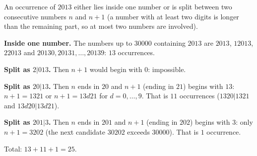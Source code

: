 An occurrence of $2013$ either lies inside one number or is split between two consecutive numbers $n$ and $n+1$ (a number with at least two digits is longer than the remaining part, so at most two numbers are involved).

\textbf{Inside one number.} The numbers up to $30000$ containing $2013$ are $2013$, $12013$, $22013$ and $20130,20131,\dots,20139$: $13$ occurrences.

\textbf{Split as $2|013$.} Then $n+1$ would begin with $0$: impossible.

\textbf{Split as $20|13$.} Then $n$ ends in $20$ and $n+1$ (ending in $21$) begins with $13$: $n+1=1321$ or $n+1=13d21$ for $d=0,\dots,9$. That is $11$ occurrences ($1320|1321$ and $13d20|13d21$).

\textbf{Split as $201|3$.} Then $n$ ends in $201$ and $n+1$ (ending in $202$) begins with $3$: only $n+1=3202$ (the next candidate $30202$ exceeds $30000$). That is $1$ occurrence.

Total: $13+11+1=\boxed{25}$.
